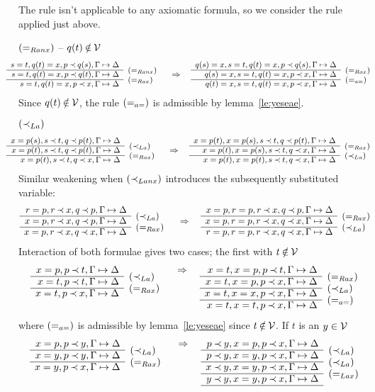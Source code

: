 \begin{PROOF}
The rule isn't applicable to any axiomatic formula, so we consider the
rule applied just above.
\begin{LS}
\item $(=_{Ranx})$ -- $q(t)\not\in\Vars$
\[\sma{ \prarc{
s=t, q(t)=x, p\Incl q(s), \GSD \cl
s=t, q(t)=x, p\Incl q(t), \GSD & \rabove{\eRanx} \cl
s=t, q(t)=x, p\Incl x, \GSD & \rabove{\eRax} 
}\conv
\prarc{
q(s)= x, s=t, q(t)=x, p\Incl q(s), \GSD \cl
q(s)= x, s=t, q(t)=x, p\Incl x, \GSD & \rabove{\eRax} \cl
q(t)= x, s=t, q(t)=x, p\Incl x, \GSD & \rabove{\eae}
} }
\]
Since $q(t)\not\in\Vars$, the rule $(=_{a=})$ is admissible by lemma~\ref{le:yeseae}.
\item $(\mathbin{\prec}_{La})$  %
\[\sma{ \prarc{
x= p(s), s\Incl t, q\Incl p(t), \GSD \cl %
x= p(t), s\Incl t, q\Incl p(t), \GSD & \rabove{\iLa} \cl %
x= p(t), s\Incl t, q\Incl x, \GSD & \rabove{\eRax}
}\conv
\prarc{
x=p(t), x= p(s), s\Incl t, q\Incl p(t), \GSD \cl
x=p(t), x= p(s), s\Incl t, q\Incl x, \GSD & \rabove{\eRax} \cl
x=p(t), x= p(t), s\Incl t, q\Incl x, \GSD & \rabove{\iLa} 
} }
\]
Similar weakening when $(\mathbin{\prec}_{Lanx})$ introduces the subsequently substituted variable:
\[\prarc{
r=p, r\Incl x, q\Incl p, \GSD \cl
x=p, r\Incl x, q\Incl p, \GSD & \rabove{\iLa} \cl
x=p, r\Incl x, q\Incl x, \GSD & \rabove{\eRax}
}\conv
\prarc{
x=p, r=p, r\Incl x, q\Incl p, \GSD \cl
x=p, r=p, r\Incl x, q\Incl x, \GSD & \rabove{\eRax} \cl
r=p, r=p, r\Incl x, q\Incl x, \GSD & \rabove{\iLa}
}
\]
Interaction of both formulae gives two cases; the first with $t\not\in\Vars$
\[\prar{
x=p, p\Incl t, \GSD \cl
x=t, p\Incl t, \GSD  & \rabove{\iLa} \cl
x=t, p\Incl x, \GSD  & \rabove{\eRax}
}\conv
\prar{
x=t, x=p, p\Incl t, \GSD \cl
x=t, x=p, p\Incl x, \GSD & \rabove{\eRax} \cl
x=t, x=x, p\Incl x, \GSD & \rabove{\iLa} \cl
x=t, x=t, p\Incl x, \GSD & \rabove{\eae} 
}
\]
where $(=_{a=})$ is admissible by lemma~\ref{le:yeseae} since $t\not\in\Vars$. 
If $t$ is an $y\in{\cal V}$
\[\prar{
x=p, p\Incl y, \GSD \cl
x=y, p\Incl y, \GSD & \rabove{\iLa} \cl
x=y, p\Incl x, \GSD & \rabove{\eRax}
}\conv
\prar{
p\Incl y, x=p, p\Incl x, \GSD \cl
p\Incl y, x=y, p\Incl x, \GSD  & \rabove{\iLa} \cl
x\Incl y, x=y, p\Incl x, \GSD  & \rabove{\iLa} \cl
y\Incl y, x=y, p\Incl x, \GSD  & \rabove{\eLax} \cl
}\]
\end{LS}
\end{PROOF}
